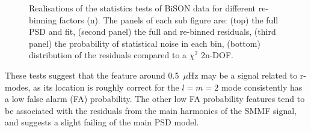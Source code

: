 \begin{figure}[!ht]
	\qquad
	
	\caption{Realisations of the statistics tests of BiSON data for different re-binning factors (n). The panels of each sub figure are: (top) the full PSD and fit, (second panel) the full and re-binned residuals, (third panel) the probability of statistical noise in each bin, (bottom) distribution of the residuals compared to a $\chi^2$ 2n-DOF.}
	\label{fig:BiSON_new_asymm_stats}
\end{figure}


These tests suggest that the feature around 0.5~$\mu$Hz may be a signal related to r-modes, as its location is roughly correct for the $l=m=2$ mode consistently has a low false alarm (FA) probability. The other low FA probability features tend to be associated with the residuals from the main harmonics of the SMMF signal, and suggests a slight failing of the main PSD model.


